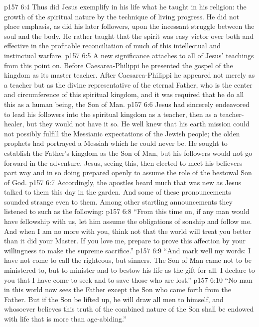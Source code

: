 \vs p157 6:4 Thus did Jesus exemplify in his life what he taught in his religion: the growth of the spiritual nature by the technique of living progress. He did not place emphasis, as did his later followers, upon the incessant struggle between the soul and the body. He rather taught that the spirit was easy victor over both and effective in the profitable reconciliation of much of this intellectual and instinctual warfare.
\pc \vs p157 6:5 A new significance attaches to all of Jesus’ teachings from this point on. Before Caesarea\hyp{}Philippi he presented the gospel of the kingdom as its master teacher. After Caesarea\hyp{}Philippi he appeared not merely as a teacher but as the divine representative of the eternal Father, who is the center and circumference of this spiritual kingdom, and it was required that he do all this as a human being, the Son of Man.
\vs p157 6:6 Jesus had sincerely endeavored to lead his followers into the spiritual kingdom as a teacher, then as a teacher\hyp{}healer, but they would not have it so. He well knew that his earth mission could not possibly fulfill the Messianic expectations of the Jewish people; the olden prophets had portrayed a Messiah which he could never be. He sought to establish the Father’s kingdom as the Son of Man, but his followers would not go forward in the adventure. Jesus, seeing this, then elected to meet his believers part way and in so doing prepared openly to assume the role of the bestowal Son of God.
\vs p157 6:7 Accordingly, the apostles heard much that was new as Jesus talked to them this day in the garden. And some of these pronouncements sounded strange even to them. Among other startling announcements they listened to such as the following:
\pc \vs p157 6:8 \textcolor{ubdarkred}{“From this time on, if any man would have fellowship with us, let him assume the obligations of sonship and follow me. And when I am no more with you, think not that the world will treat you better than it did your Master. If you love me, prepare to prove this affection by your willingness to make the supreme sacrifice.”}
\pc \vs p157 6:9 \textcolor{ubdarkred}{“And mark well my words: I have not come to call the righteous, but sinners. The Son of Man came not to be ministered to, but to minister and to bestow his life as the gift for all. I declare to you that I have come to seek and to save those who are lost.”}
\pc \vs p157 6:10 \textcolor{ubdarkred}{“No man in this world now sees the Father except the Son who came forth from the Father. But if the Son be lifted up, he will draw all men to himself, and whosoever believes this truth of the combined nature of the Son shall be endowed with life that is more than age\hyp{}abiding.”}
